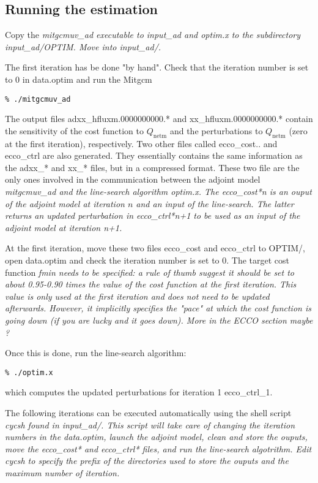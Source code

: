 \subsection{Running the estimation}

Copy the \it{mitgcmuv\_ad} executable to input\_ad and \it{optim.x}
to the subdirectory input\_ad/OPTIM. Move into input\_ad/.

The first iteration has be done "by hand". Check that the iteration number is set
to 0 in data.optim and run the Mitgcm
\begin{verbatim}
% ./mitgcmuv_ad
\end{verbatim}

The output files adxx\_hfluxm.0000000000.* and xx\_hfluxm.0000000000.* contain
the sensitivity of the cost function to $Q_\mathrm{netm}$ and the perturbations
to $Q_\mathrm{netm}$ (zero at the first iteration), respectively. Two other files
called ecco\_cost.. and ecco\_ctrl are also generated. They essentially contains
the same information as the adxx\_* and xx\_* files, but in a compressed format.
These two file are the only ones involved in the communication between the adjoint
model \it{mitgcmuv\_ad} and the line-search algorithm \it{optim.x}. The ecco\_cost*n
is an ouput of the adjoint model at iteration $n$ and an input of the line-search. The
latter returns an updated perturbation in ecco\_ctrl*n+1 to be used as an input of
the adjoint model at iteration n+1. 

At the first iteration, move these two files ecco\_cost and ecco\_ctrl 
to OPTIM/, open data.optim and check the iteration number is set to 0.
The target cost function \it{fmin} needs to be specified: a rule of thumb 
suggest it should be set to about 0.95-0.90 times the value of the cost
function at the first iteration. This value is only used at the first
iteration and does not need to be updated afterwards. 
However, it implicitly specifies the "pace" at which the cost function is
going down (if you are lucky and it goes down). More in the ECCO section maybe ?

Once this is done, run the line-search algorithm:
\begin{verbatim}
% ./optim.x
\end{verbatim}
which computes the updated perturbations for iteration 1 ecco\_ctrl\_1.

The following iterations can be executed automatically using the shell script \it{cycsh}
found in input\_ad/. This script will take care of changing the iteration numbers in the
data.optim, launch the adjoint model, clean and store the ouputs, move the
ecco\_cost* and ecco\_ctrl* files, and run the line-search algotrithm.
Edit \it{cycsh} to specify the prefix of the directories used to store the ouputs and
the maximum number of iteration.

